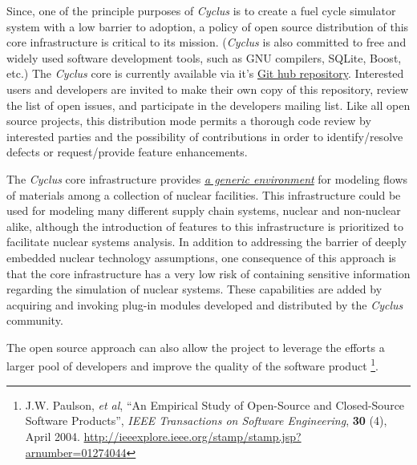 \documentclass[letterpaper,10pt,english]{sphinxmanual}
\begin{document}
Since, one of the principle purposes of \emph{Cyclus} is to create a fuel
cycle simulator system with a low barrier to adoption, a policy of
open source distribution of this core infrastructure is critical to
its mission.  (\emph{Cyclus} is also committed to free and widely used
software development tools, such as GNU compilers, SQLite, Boost,
etc.)  The \emph{Cyclus} core is currently available via it's \href{http://github.com/cyclus/cyclus}{Git hub
repository}.  Interested users and
developers are invited to make their own copy of this repository,
review the list of open issues, and participate in the developers
mailing list. Like all open source projects, this distribution mode
permits a thorough code review by interested parties and the
possibility of contributions in order to identify/resolve defects or
request/provide feature enhancements.

The \emph{Cyclus} core infrastructure provides {\hyperref[devdoc/cyclus_env::doc]{\emph{a generic environment}}} for modeling flows of materials among a
collection of nuclear facilities.  This infrastructure could be used
for modeling many different supply chain systems, nuclear and
non-nuclear alike, although the introduction of features to this
infrastructure is prioritized to facilitate nuclear systems analysis.
In addition to addressing the barrier of deeply embedded nuclear
technology assumptions, one consequence of this approach is that the
core infrastructure has a very low risk of containing sensitive
information regarding the simulation of nuclear systems.  These
capabilities are added by acquiring and invoking plug-in modules
developed and distributed by the \emph{Cyclus} community.

The open source approach can also allow the project to leverage the
efforts a larger pool of developers and improve the quality of the
software product \footnote{
J.W. Paulson, \emph{et al}, ``An Empirical Study of Open-Source and Closed-Source Software Products'', \emph{IEEE Transactions on Software Engineering}, \textbf{30} (4), April 2004. \href{http://ieeexplore.ieee.org/stamp/stamp.jsp?arnumber=01274044}{http://ieeexplore.ieee.org/stamp/stamp.jsp?arnumber=01274044}
}.
\end{document}
